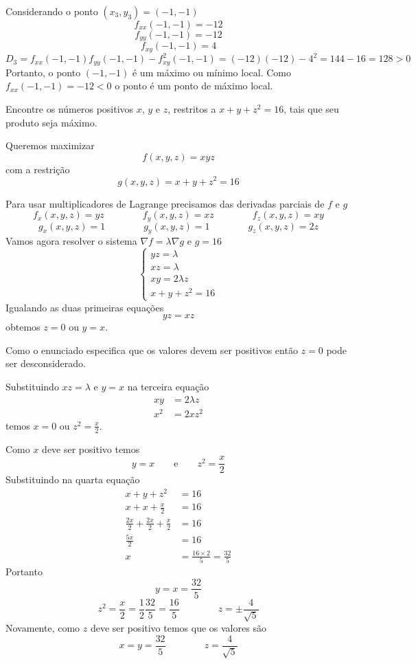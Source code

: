 \documentclass[a4paper,12pt,fleqn]{article}
\begin{document}
\begin{answer}
  Considerando o ponto \((x_3, y_3) = (-1, -1)\)
  \[
    f_{xx}(-1, -1) = -12
  \]
  \[
    f_{yy}(-1, -1) = -12
  \]
  \[
    f_{xy}(-1, -1) = 4
  \]
  \[
    D_3
    = f_{xx}(-1, -1)f_{yy}(-1, -1) - f^2_{xy}(-1, -1)
    = (-12)(-12) - 4^2
    = 144 -16
    = 128 > 0
  \]
  Portanto, o ponto $(-1, -1)$ é um máximo ou mínimo local. Como \(f_{xx}(-1, -1) = -12 < 0\)
  o ponto é um ponto de máximo local.
  \clearpage
\end{answer}

Encontre os números positivos $x$, $y$ e $z$, restritos a \(x+y+z^2=16\),
tais que seu produto seja máximo.

\begin{answer}
  Queremos maximizar
  \[
    f(x, y, z) = xyz
  \]
  com a restrição
  \[
    g(x, y, z) = x + y + z^2 = 16
  \]

  Para usar multiplicadores de Lagrange precisamos das derivadas parciais de $f$ e $g$
  \[
    f_x(x, y, z) = yz \qquad\qquad
    f_y(x, y, z) = xz \qquad\qquad
    f_z(x, y, z) = xy
  \]
  \[
    g_x(x, y, z) = 1 \qquad\qquad
    g_y(x, y, z) = 1 \qquad\qquad
    g_z(x, y, z) = 2z
  \]
  Vamos agora resolver o sistema \(\nabla f = \lambda\nabla g\) e \(g=16\)
  \[
  \begin{cases}
    yz = \lambda \\
    xz = \lambda \\
    xy = 2\lambda z \\
    x + y + z^2 = 16
  \end{cases}
  \]
  Igualando as duas primeiras equações
  \[
    yz = xz
  \]
  obtemos \(z=0\) ou \(y=x\).

  Como o enunciado especifica que os valores devem ser positivos então
  $z=0$ pode ser desconsiderado.

  Substituindo \(xz = \lambda\) e \(y=x\) na terceira equação
  \begin{align*}
    xy  & = 2\lambda z \\
    x^2 & = 2xz^2
  \end{align*}
  temos \(x=0\) ou \(z^2=\frac{x}{2}\).

  Como $x$ deve ser positivo temos
  \[
    y = x \qquad\text{e}\qquad z^2=\frac{x}{2}
  \]
  Substituindo na quarta equação
  \begin{align*}
    x + y + z^2 & = 16 \\[2mm]
    x + x + \frac{x}{2} & = 16 \\[2mm]
    \frac{2x}{2} + \frac{2x}{2} + \frac{x}{2} & = 16 \\[2mm]
    \frac{5x}{2} & = 16 \\[2mm]
    x & = \frac{16\times 2}{5} = \frac{32}{5}
  \end{align*}
  Portanto
  \[
    y = x = \frac{32}{5}
  \]
  \[
    z^2 = \frac{x}{2} = \frac{1}{2}\frac{32}{5} = \frac{16}{5}
    \qquad\qquad
    z = \pm \frac{4}{\sqrt{5}}
  \]
  Novamente, como $z$ deve ser positivo temos que os valores são
  \[
    x = y = \frac{32}{5} \qquad\qquad
    z = \frac{4}{\sqrt{5}}
  \]
\end{answer}

\end{document}
